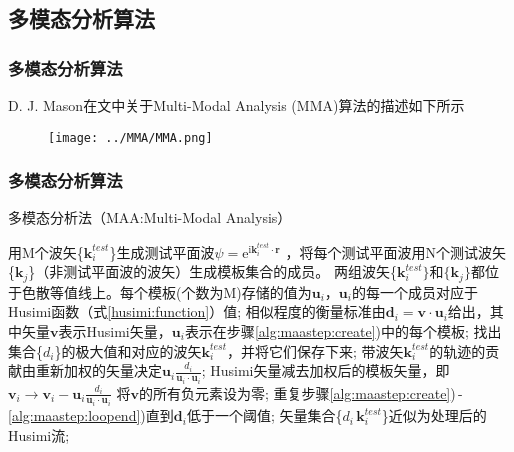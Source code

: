 \documentclass[UTF8]{beamer}
\begin{document}
\subsection{多模态分析算法}
\begin{frame}
    \frametitle{多模态分析算法}
    D. J. Mason在文中关于Multi-Modal Analysis (MMA)算法的描述如下所示
    \begin{figure}
        \centering
        \texttt{[image: ../MMA/MMA.png]}
    \end{figure}
\end{frame}
\begin{frame}
    \frametitle{多模态分析算法}
    \begin{algorithm}[H] 
        \caption{多模态分析法（MAA:Multi-Modal Analysis）}
        \label{alg:maa}
        \begin{algorithmic}[1]
            \STATE 用M个波矢\{$\mathbf{k}^{test}_{i}$\}生成测试平面波$\psi=\mathrm{e}^{\mathrm{i}\mathbf{k}_i^{test}\cdot\mathbf{r}}$ ，将每个测试平面波用N个测试波矢\{$\mathbf{k}_j$\}（非测试平面波的波矢）生成模板集合的成员。
               两组波矢\{$\mathbf{k}_{i}^{test}\}$和$\{\mathbf{k}_{j}\}$都位于色散等值线上。每个模板(个数为M)存储的值为$\mathbf{u}_i$，$\mathbf{u}_i$的每一个成员对应于Husimi函数（式\ref{husimi:function}）值;
            \label{alg:maastep:create}
            \STATE 相似程度的衡量标准由$\mathbf{d}_i=\mathbf{v}\cdot\mathbf{u}_i$给出，其中矢量$\mathbf{v}$表示Husimi矢量，$\mathbf{u}_i$表示在步骤\ref{alg:maastep:create})中的每个模板;
            \STATE 找出集合\{$d_i$\}的极大值和对应的波矢$\mathbf{k}^{test}_i$，并将它们保存下来;
            \STATE 带波矢$\mathbf{k}^{test}_{i}$的轨迹的贡献由重新加权的矢量决定$\mathbf{u}_{i}\frac{d_{i}}{\mathbf{u}_{i}\cdot\mathbf{u}_{i}}$;
            \STATE Husimi矢量减去加权后的模板矢量，即$\mathbf{v}_{i}\rightarrow\mathbf{v}_{i}-\mathbf{u}_{i}\frac{d_{i}}{\mathbf{u}_{i}\cdot\mathbf{u}_{i}}$
            \STATE 将$\mathbf{v}$的所有负元素设为零;
            \label {alg:maastep:loopend}
            \STATE 重复步骤\ref{alg:maastep:create})\,-\,\ref{alg:maastep:loopend})直到$\mathbf{d}_{i}$低于一个阈值;
            \STATE 矢量集合\{$d_{i}\,\mathbf{k}^{test}_i$\}近似为处理后的Husimi流;
        \end{algorithmic}
    \end{algorithm}
\end{frame}
\end{document}
